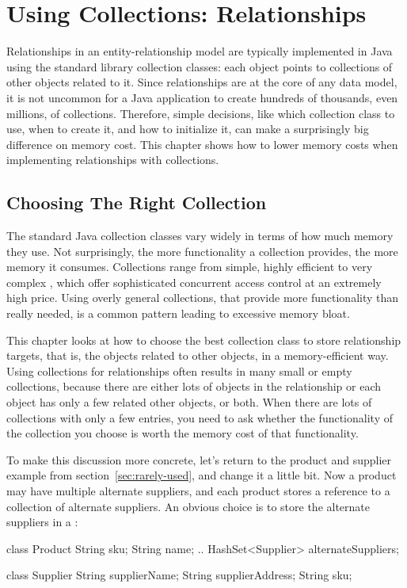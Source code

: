 \chapter{Using Collections: Relationships}

Relationships in an
entity-relationship model are typically implemented in Java using the
standard library collection classes:
each object points to collections of other objects related to it.
Since relationships are at the core of any data model, it
 is not uncommon for a Java application to create hundreds of
thousands, even millions, of collections. Therefore, simple decisions, like
which collection class to use, when to create it, and how to initialize it,
can make a surprisingly big difference on memory cost.
This chapter shows
 how to lower memory costs when implementing relationships with collections.
 
 \section{Choosing The Right Collection}

The standard Java collection classes vary widely in terms of how much memory they use.
Not surprisingly, the more functionality a collection provides, the more
memory it consumes. Collections range from simple, highly efficient
 to very complex
, which offer sophisticated concurrent access
control at an extremely high price. 
Using overly general collections, that provide more functionality than
really needed, is a common pattern leading to excessive memory bloat.

This chapter looks at how to choose the best collection class to
store relationship targets, that is, the objects related to other
objects, in a memory-efficient way. 
Using collections for relationships often results in many small or empty
collections, because there are either lots of objects in the relationship or
each object has only a few related other objects, or both. When there are lots
of collections with only a few entries, you need to ask  whether the
functionality of the collection you choose is worth the memory cost of that
functionality.

To make this discussion more concrete, let's return to the product and supplier example 
from section~\ref{sec:rarely-used}, and change it a little
 bit. Now a product may have multiple alternate suppliers, and each product
 stores a reference to a collection of alternate suppliers. An obvious choice is
 to store the alternate suppliers in a :
 \begin{shortlisting} 
class Product {
	String sku;
	String name;
	.. 
	HashSet<Supplier> alternateSuppliers;
}

class Supplier {
	String supplierName;
	String supplierAddress;
	String sku;
}
\end{shortlisting}
 

